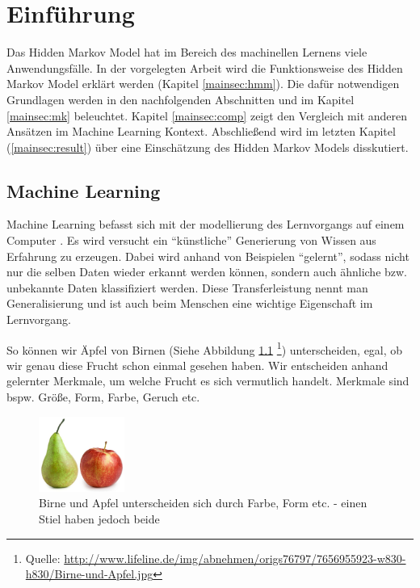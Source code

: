 \chapter{Einführung}

\label{chap:intro}

Das Hidden Markov Model hat im Bereich des machinellen Lernens viele Anwendungsfälle. In der vorgelegten Arbeit wird die Funktionsweise des Hidden Markov Model erklärt werden (Kapitel \ref{mainsec:hmm}). Die dafür notwendigen Grundlagen werden in den nachfolgenden Abschnitten und im Kapitel \ref{mainsec:mk} beleuchtet.
Kapitel \ref{mainsec:comp} zeigt den Vergleich mit anderen Ansätzen im Machine Learning Kontext. Abschließend wird im letzten Kapitel (\ref{mainsec:result}) über eine Einschätzung des Hidden Markov Models disskutiert.

\section{Machine Learning}
Machine Learning befasst sich mit der modellierung des Lernvorgangs auf einem Computer \cite{marsland}. Es wird versucht ein ``künstliche'' Generierung von Wissen aus Erfahrung zu erzeugen.
Dabei wird anhand von Beispielen ``gelernt'', sodass nicht nur die selben Daten wieder erkannt werden können, sondern auch ähnliche bzw. unbekannte Daten klassifiziert werden. Diese Transferleistung nennt man Generalisierung und ist auch beim Menschen eine wichtige Eigenschaft im Lernvorgang.

So können wir Äpfel von Birnen (Siehe Abbildung \ref{fig:apfelbirne} \footnote{Quelle: \url{http://www.lifeline.de/img/abnehmen/origs76797/7656955923-w830-h830/Birne-und-Apfel.jpg}}) unterscheiden, egal, ob wir genau diese Frucht schon einmal gesehen haben. Wir entscheiden anhand gelernter Merkmale, um welche Frucht es sich vermutlich handelt. Merkmale sind bspw. Größe, Form, Farbe, Geruch etc.

\begin{figure}[htbp] \centering
    \includegraphics[width=0.25\textwidth]{Bilder/Kap1/birneapfel}
    \caption{ Birne und Apfel unterscheiden sich durch Farbe, Form etc. - einen Stiel haben jedoch beide}
    \label{fig:apfelbirne}
\end{figure}


